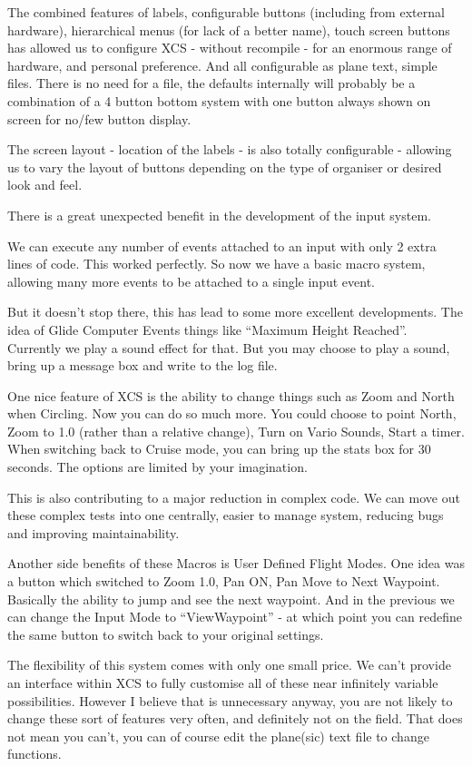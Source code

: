 The combined features of labels, configurable buttons (including from
external hardware), hierarchical menus (for lack of a better name),
touch screen buttons has allowed us to configure XCS - without
recompile - for an enormous range of hardware, and personal
preference.  And all configurable as plane text, simple files. There
is no need for a file, the defaults internally will probably be a
combination of a 4 button bottom system with one button always shown
on screen for no/few button display.

The screen layout - location of the labels - is also totally
configurable - allowing us to vary the layout of buttons depending on
the type of organiser or desired look and feel.

There is a great unexpected benefit in the development of the input
system.

We can execute any number of events attached to an input with only 2
extra lines of code. This worked perfectly. So now we have a basic
macro system, allowing many more events to be attached to a single
input event.

But it doesn't stop there, this has lead to some more excellent
developments. The idea of Glide Computer Events things like ``Maximum
Height Reached''. Currently we play a sound effect for that. But you
may choose to play a sound, bring up a message box and write to the
log file.

One nice feature of XCS is the ability to change things such as Zoom
and North when Circling. Now you can do so much more. You could choose
to point North, Zoom to 1.0 (rather than a relative change), Turn on
Vario Sounds, Start a timer. When switching back to Cruise mode, you
can bring up the stats box for 30 seconds. The options are limited by
your imagination.

This is also contributing to a major reduction in complex code. We can
move out these complex tests into one centrally, easier to manage
system, reducing bugs and improving maintainability.

Another side benefits of these Macros is User Defined Flight
Modes. One idea was a button which switched to Zoom 1.0, Pan ON, Pan
Move to Next Waypoint. Basically the ability to jump and see the next
waypoint. And in the previous we can change the Input Mode to
``ViewWaypoint'' - at which point you can redefine the same button to
switch back to your original settings.

The flexibility of this system comes with only one small price. We
can't provide an interface within XCS to fully customise all of these
near infinitely variable possibilities. However I believe that is
unnecessary anyway, you are not likely to change these sort of
features very often, and definitely not on the field. That does not
mean you can't, you can of course edit the plane(sic) text file to
change functions.

